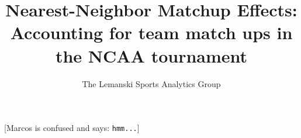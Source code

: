 \documentclass[11pt]{article} %
\title{Nearest-Neighbor Matchup Effects:  Accounting for team match ups in the NCAA tournament}
\author{The Lemanski Sports Analytics Group}
\newcommand{\marcosc}[1]{[{\color{blue}\sc Marcos is confused and says: {\tt #1}}]}
\begin{document}
\maketitle







%






\marcosc{hmm...}
\cite{Gelman}







\end{document}
